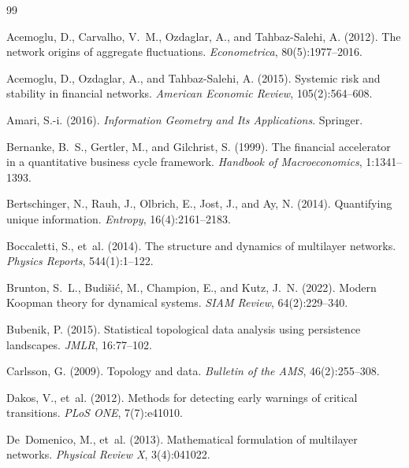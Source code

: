 \documentclass[11pt,a4paper]{article}
\theoremstyle{definition}
\begin{document}

\begin{thebibliography}{99}

Acemoglu, D., Carvalho, V.~M., Ozdaglar, A., and Tahbaz-Salehi, A. (2012). The network origins of aggregate fluctuations. \emph{Econometrica}, 80(5):1977--2016.

Acemoglu, D., Ozdaglar, A., and Tahbaz-Salehi, A. (2015). Systemic risk and stability in financial networks. \emph{American Economic Review}, 105(2):564--608.

Amari, S.-i. (2016). \emph{Information Geometry and Its Applications}. Springer.

Bernanke, B.~S., Gertler, M., and Gilchrist, S. (1999). The financial accelerator in a quantitative business cycle framework. \emph{Handbook of Macroeconomics}, 1:1341--1393.

Bertschinger, N., Rauh, J., Olbrich, E., Jost, J., and Ay, N. (2014). Quantifying unique information. \emph{Entropy}, 16(4):2161--2183.

Boccaletti, S., et~al. (2014). The structure and dynamics of multilayer networks. \emph{Physics Reports}, 544(1):1--122.

Brunton, S.~L., Budi\v{s}i\'{c}, M., Champion, E., and Kutz, J.~N. (2022). Modern Koopman theory for dynamical systems. \emph{SIAM Review}, 64(2):229--340.

Bubenik, P. (2015). Statistical topological data analysis using persistence landscapes. \emph{JMLR}, 16:77--102.

Carlsson, G. (2009). Topology and data. \emph{Bulletin of the AMS}, 46(2):255--308.

Dakos, V., et~al. (2012). Methods for detecting early warnings of critical transitions. \emph{PLoS ONE}, 7(7):e41010.

De~Domenico, M., et~al. (2013). Mathematical formulation of multilayer networks. \emph{Physical Review X}, 3(4):041022.


\end{thebibliography}
\end{document}
